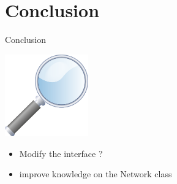 \documentclass[a4paper,10pt]{beamer}
\begin{document}
	\section{Conclusion}
	
		\begin{frame}{Conclusion}
			\centerline{\includegraphics[height=100pt]{images/conclusion/loupe.png}}
			\begin{itemize}
				\item Modify the interface ?
				\item improve knowledge on the Network class
			\end{itemize}
		\end{frame}
\end{document}
